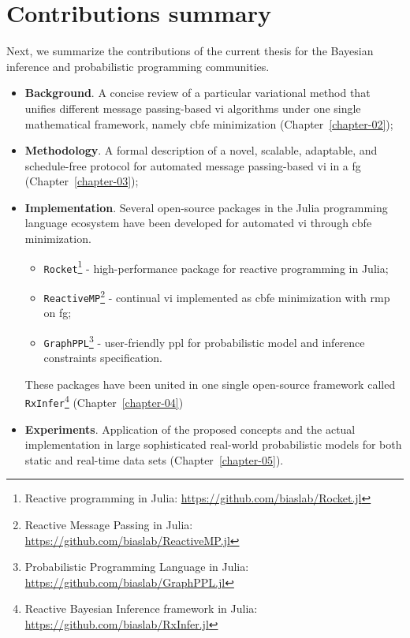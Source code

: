 \section{Contributions summary}\label{chapter-01:section:summary}

Next, we summarize the contributions of the current thesis for the Bayesian inference and
probabilistic programming communities.

\begin{itemize}
	\item \textbf{Background}. A concise review of a particular variational method that unifies different message passing-based \acf{vi} algorithms under one single mathematical framework, namely \acf{cbfe} minimization (Chapter~\ref{chapter-02});
	\item \textbf{Methodology}. A formal description of a novel, scalable, adaptable, and schedule-free protocol for automated message passing-based \ac{vi} in a \acf{fg} (Chapter~\ref{chapter-03});
	\item \textbf{Implementation}. Several open-source packages in the Julia programming language ecosystem have been developed for automated \ac{vi} through \ac{cbfe} minimization.
	      \begin{itemize}
		      \item \texttt{Rocket}\footnote{Reactive programming in Julia: \url{https://github.com/biaslab/Rocket.jl}} - high-performance package for reactive programming in Julia;
		      \item \texttt{ReactiveMP}\footnote{Reactive Message Passing in Julia: \url{https://github.com/biaslab/ReactiveMP.jl}} - continual \ac{vi} implemented as \ac{cbfe} minimization with \ac{rmp} on \ac{fg};
		      \item \texttt{GraphPPL}\footnote{Probabilistic Programming Language in Julia: \url{https://github.com/biaslab/GraphPPL.jl}} - user-friendly \acf{ppl} for probabilistic model and inference constraints specification.
	      \end{itemize}
       These packages have been united in one single open-source framework called \texttt{RxInfer}\footnote{Reactive Bayesian Inference framework in Julia: \url{https://github.com/biaslab/RxInfer.jl}} (Chapter~\ref{chapter-04})
	\item \textbf{Experiments}. Application of the proposed concepts and the actual implementation in large sophisticated real-world probabilistic models for both static and real-time data sets (Chapter~\ref{chapter-05}).
\end{itemize}
